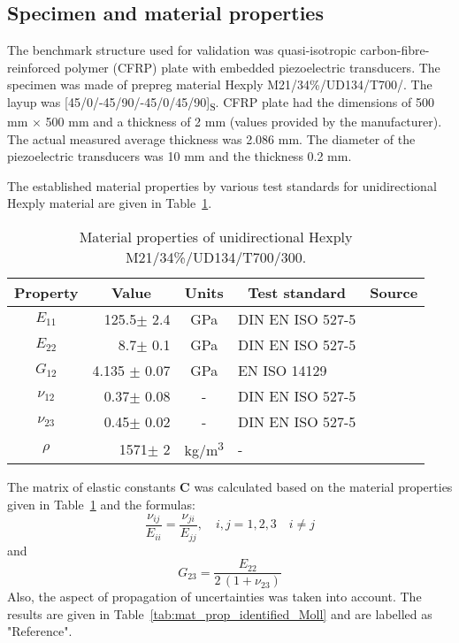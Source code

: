 \documentclass[preprint,12pt]{elsarticle}
\newcommand{\matr}[1]{\mathbf{#1}} %
\begin{document}
\subsection{Specimen and material properties \label{sec:spec}}
The benchmark structure used for validation was quasi-isotropic carbon-fibre-reinforced polymer (CFRP) plate with embedded piezoelectric transducers. 
The specimen was made of prepreg material Hexply\textsuperscript{\textregistered} M21/34\%/\-UD134/\-T700/.
The layup was [45/0/-45/90/-45/0/45/90]\textsubscript{S}. 
CFRP plate had the dimensions of 500 mm \(\times\) 500 mm and a thickness of 2 mm 
(values provided by the manufacturer). 
The actual measured average thickness was 2.086 mm. 
The diameter of the piezoelectric transducers was 10 mm and the thickness 0.2 mm. 

The established material properties by various test standards for unidirectional Hexply material are given in Table~\ref{tab:mat_prop_Moll}. 

\begin{table}
	\renewcommand{\arraystretch}{1.3}
	\centering \footnotesize
	\caption{Material properties of unidirectional Hexply M21/34\%/UD134/T700/300.}
		\begin{tabular}{crclc} 
			\toprule
			Property &  \multicolumn{1}{c}{Value}  & Units & \multicolumn{1}{c}{Test standard} & Source \\
			\midrule
			$E_{11}$ & 125.5$\pm$ 2.4   & GPa & DIN EN ISO 527-5 & \cite{Moll2019} \\
			$E_{22}$ & 8.7$\pm$ 0.1     & GPa & DIN EN ISO 527-5 & \cite{Moll2019} \\
			$G_{12}$ & 4.135 $\pm$ 0.07 & GPa & EN ISO 14129 & \cite{Petersen2016} \\
			$\nu_{12}$ & 0.37$\pm$ 0.08 & -   & DIN EN ISO 527-5 & \cite{Moll2019} \\
			$\nu_{23}$ & 0.45$\pm$ 0.02 & -   & DIN EN ISO 527-5 & \cite{Moll2019} \\
			$\rho$ & 1571$\pm$ 2 & kg/m\textsuperscript{3}   & - & \cite{Moll2019} \\
			\bottomrule 
		\end{tabular} 
		\label{tab:mat_prop_Moll}
\end{table}
The matrix of elastic constants $\matr{C}$ was calculated based on the material properties given in Table~\ref{tab:mat_prop_Moll} and the formulas:
\begin{equation}
	\frac{\nu_{ij}}{E_{ii}}=\frac{\nu_{ji}}{E_{jj}},\quad i,j=1,2,3\quad i\ne j
	\label{eq:recalc}
\end{equation}
and 
\begin{equation}
	G_{23} = \frac{E_{22}}{2\,(1+\nu_{23})}
	\label{eq:recalc2}
\end{equation}
Also, the aspect of propagation of uncertainties was taken into account.
The results are given in Table~\ref{tab:mat_prop_identified_Moll} and are labelled as "Reference".
\end{document}
